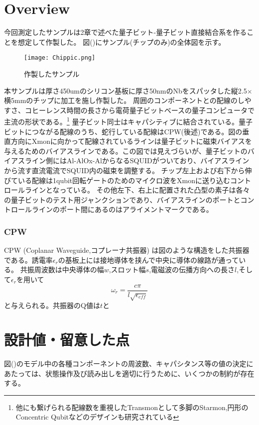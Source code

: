 \section{Overview}
    今回測定したサンプルは2章で述べた量子ビット-量子ビット直接結合系を作ることを想定して作製した。
    図()にサンプル(チップのみ)の全体図を示す。
    \begin{figure}[H]
        \begin{center}
            \texttt{[image: Chippic.png]}
            \caption{作製したサンプル}
        \end{center}
    \end{figure}
    本サンプルは厚さ450umのシリコン基板に厚さ50nmのNbをスパッタした縦2.5$\times$横5mmのチップに加工を施し作製した。
    周囲のコンポーネントとの配線のしやすさ、コヒーレンス時間の長さから電荷量子ビットベースの量子コンピュータで主流の形状である。\footnote{他にも繋げられる配線数を重視したTransmonとして多脚のStarmon,円形のConcentric Qubitなどのデザインも研究されている}
    量子ビット同士はキャパシティブに結合されている。量子ビットにつながる配線のうち、蛇行している配線はCPW(後述)である。図の垂直方向にXmonに向かって配線されているラインは量子ビットに磁束バイアスを与えるためのバイアスラインである。この図では見えづらいが、量子ビットのバイアスライン側にはAl-AlOx-AlからなるSQUIDがついており、バイアスラインから流す直流電流でSQUID内の磁束を調整する。
    チップ左上および右下から伸びている配線は1qubit回転ゲートのためのマイクロ波をXmonに送り込むコントロールラインとなっている。
    その他左下、右上に配置された凸型の素子は各々の量子ビットのテスト用ジャンクションであり、バイアスラインのポートとコントロールラインのポート間にあるのはアライメントマークである。
\subsubsection{CPW}
CPW (Coplanar Waveguide,コプレーナ共振器) は図のような構造をした共振器である。誘電率$\epsilon_r$の基板上には接地導体を挟んで中央に導体の線路が通っている。
共振周波数は中央導体の幅$w$,スロット幅$s$,電磁波の伝播方向への長さ$l$,そして$\epsilon_r$を用いて
\begin{equation}
    \omega_{r}=\frac{c \pi}{l \sqrt{\epsilon_{e f f}}}
\end{equation}
と与えられる。共振器のQ値は$t$と

\section{設計値・留意した点}
図()のモデル中の各種コンポーネントの周波数、キャパシタンス等の値の決定にあたっては、状態操作及び読み出しを適切に行うために、いくつかの制約が存在する。
